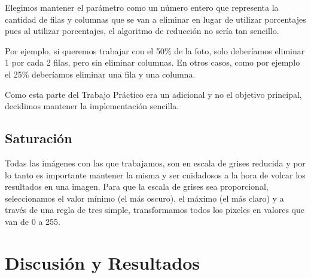 \documentclass[a4paper]{article}
\begin{document}
Elegimos mantener el parámetro como un número entero que representa la cantidad de filas y columnas que se van a eliminar en lugar de utilizar porcentajes pues al utilizar porcentajes, el algoritmo de reducción no sería tan sencillo.

Por ejemplo, si queremos trabajar con el 50\% de la foto, solo deberíamos eliminar 1 por cada 2 filas, pero sin eliminar columnas. En otros casos, como por ejemplo el 25\% deberíamos eliminar una fila y una columna.

Como esta parte del Trabajo Práctico era un adicional y no el objetivo principal, decidimos mantener la implementación sencilla.

\subsection{Saturación}

Todas las imágenes con las que trabajamos, son en escala de grises reducida y por lo tanto es importante mantener la misma y ser cuidadosos a la hora de volcar los resultados en una imagen. Para que la escala de grises sea proporcional, seleccionamos el valor mínimo (el más oscuro), el máximo (el más claro) y a través de una regla de tres simple, transformamos todos los pixeles en valores que van de 0 a 255.


\newpage

\section{Discusión y Resultados}

\end{document}
